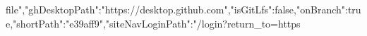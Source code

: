 file","ghDesktopPath":"https://desktop.github.com","isGitLfs":false,"onBranch":true,"shortPath":"e39aff9","siteNavLoginPath":"/login?return_to=https%
